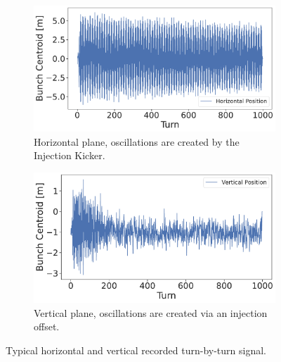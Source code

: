 \begin{figure}[!htb]
    \centering
    \begin{subfigure}[c]{0.47\textwidth}
        \includegraphics[width=\linewidth]{images/kek/horizontal_tbt_ler.pdf}
        \caption{Horizontal plane, oscillations are created by the Injection Kicker.}
    \end{subfigure}
    \hfill
    \begin{subfigure}[c]{0.48\textwidth}
        \includegraphics[width=\linewidth]{images/kek/vertical_tbt_ler.pdf}
        \caption{Vertical plane, oscillations are created via an injection offset.}
    \end{subfigure}
    \caption{Typical horizontal and vertical recorded turn-by-turn signal.}
    \label{fig:kek:tbt_signal}
\end{figure}



\subsection{}


